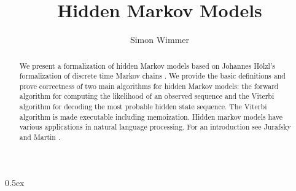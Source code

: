 \documentclass[11pt,a4paper]{article}
\begin{document}
\title{Hidden Markov Models}
\author{Simon Wimmer}
\maketitle

\begin{abstract}
We present a formalization of hidden Markov models \cite{Markov13}
based on Johannes Hölzl's formalization of discrete time Markov chains \cite{hoelzl2017mdp}.
We provide the basic definitions and prove correctness of two main algorithms for
hidden Markov models: the forward algorithm for computing the likelihood of an observed sequence
and the Viterbi algorithm for decoding the most probable hidden state sequence.
The Viterbi algorithm is made executable including memoization.
Hidden markov models have various applications in natural language processing.
For an introduction see Jurafsky and Martin \cite{Jurafsky}.

\end{abstract}

\tableofcontents

\pagebreak

\parindent 0pt\parskip 0.5ex





\end{document}
